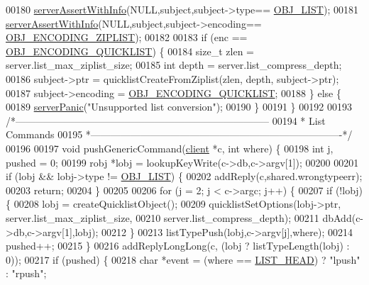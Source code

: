 \begin{DoxyCode}
00180     \hyperlink{server_8h_a7308f76cbff9a8d3797fe78190b91282}{serverAssertWithInfo}(NULL,subject,subject->type==
      \hyperlink{server_8h_a4a5f22a280949c97a0cb0d4213275126}{OBJ\_LIST});
00181     \hyperlink{server_8h_a7308f76cbff9a8d3797fe78190b91282}{serverAssertWithInfo}(NULL,subject,subject->encoding==
      \hyperlink{server_8h_aabf064ede983103f1fd0df2086e84eee}{OBJ\_ENCODING\_ZIPLIST});
00182 
00183     \textcolor{keywordflow}{if} (enc == \hyperlink{server_8h_aec792aeed6d4bf83966672e6a23043b8}{OBJ\_ENCODING\_QUICKLIST}) \{
00184         size\_t zlen = server.list\_max\_ziplist\_size;
00185         \textcolor{keywordtype}{int} depth = server.list\_compress\_depth;
00186         subject->ptr = quicklistCreateFromZiplist(zlen, depth, subject->ptr);
00187         subject->encoding = \hyperlink{server_8h_aec792aeed6d4bf83966672e6a23043b8}{OBJ\_ENCODING\_QUICKLIST};
00188     \} \textcolor{keywordflow}{else} \{
00189         \hyperlink{server_8h_a11cc378e7778a830b41240578de3b204}{serverPanic}(\textcolor{stringliteral}{"Unsupported list conversion"});
00190     \}
00191 \}
00192 
00193 \textcolor{comment}{/*-----------------------------------------------------------------------------}
00194 \textcolor{comment}{ * List Commands}
00195 \textcolor{comment}{ *----------------------------------------------------------------------------*/}
00196 
00197 \textcolor{keywordtype}{void} pushGenericCommand(\hyperlink{structclient}{client} *c, \textcolor{keywordtype}{int} where) \{
00198     \textcolor{keywordtype}{int} j, pushed = 0;
00199     robj *lobj = lookupKeyWrite(c->db,c->argv[1]);
00200 
00201     \textcolor{keywordflow}{if} (lobj && lobj->type != \hyperlink{server_8h_a4a5f22a280949c97a0cb0d4213275126}{OBJ\_LIST}) \{
00202         addReply(c,shared.wrongtypeerr);
00203         \textcolor{keywordflow}{return};
00204     \}
00205 
00206     \textcolor{keywordflow}{for} (j = 2; j < c->argc; j++) \{
00207         \textcolor{keywordflow}{if} (!lobj) \{
00208             lobj = createQuicklistObject();
00209             quicklistSetOptions(lobj->ptr, server.list\_max\_ziplist\_size,
00210                                 server.list\_compress\_depth);
00211             dbAdd(c->db,c->argv[1],lobj);
00212         \}
00213         listTypePush(lobj,c->argv[j],where);
00214         pushed++;
00215     \}
00216     addReplyLongLong(c, (lobj ? listTypeLength(lobj) : 0));
00217     \textcolor{keywordflow}{if} (pushed) \{
00218         \textcolor{keywordtype}{char} *event = (where == \hyperlink{server_8h_a5fc6a15ca26c6208f66ad2768a3108ef}{LIST\_HEAD}) ? \textcolor{stringliteral}{"lpush"} : \textcolor{stringliteral}{"rpush"};

\end{DoxyCode}

